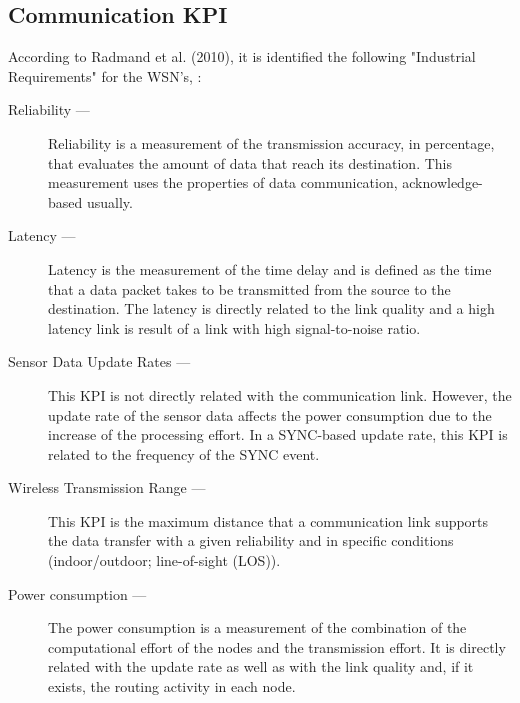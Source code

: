 \subsection{Communication \ac{KPI}}
\label{subs:334}
According to Radmand et al. (2010), it is identified the following "Industrial Requirements" for the WSN's, \cite{Radmand2010}:

\begin{description}
	\item[Reliability ---] Reliability is a measurement of the transmission accuracy, in percentage, that evaluates the amount of data that reach its destination. This measurement uses the properties of data communication, acknowledge-based usually.
	
	\item[Latency ---] Latency is the measurement of the time delay and is defined as the time that a data packet takes to be transmitted from the source to the destination. The latency is directly related to the link quality and a high latency link is result of a link with high signal-to-noise ratio. 
	
	\item[Sensor Data Update Rates ---] This \ac{KPI} is not directly related with the communication link. However, the update rate of the sensor data affects the power consumption due to the increase of the processing effort. In a SYNC-based update rate, this \ac{KPI} is related to the frequency of the SYNC event.
	
	\item[Wireless Transmission Range ---] This \ac{KPI} is the maximum distance that a communication link supports the data transfer with a given reliability and in specific conditions (indoor/outdoor; line-of-sight (LOS)).
	
	\item[Power consumption ---] The power consumption is a measurement of the combination of the computational effort of the nodes and the transmission effort. It is directly related with the update rate as well as with the link quality and, if it exists, the routing activity in each node.
	
\end{description}



